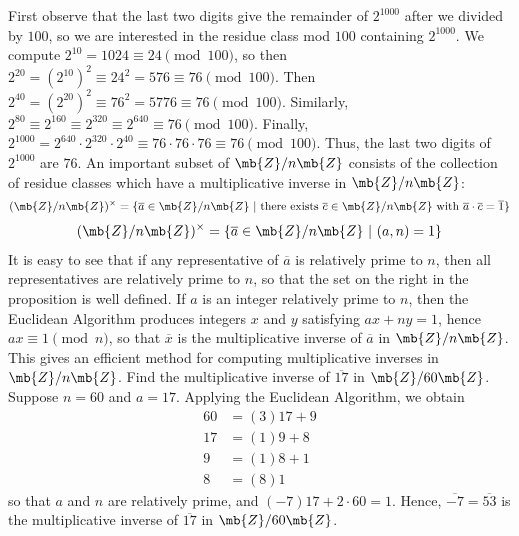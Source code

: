 {First observe that the last two digits give the remainder of $2^{1000}$ after we divided by $100$,
so we are interested in the residue class mod $100$ containing $2^{1000}$.
We compute $2^{10} = 1024 \equiv 24\pmod{100}$, so then $2^{20} = (2^{10})^{2}\equiv 24^{2} = 576\equiv 76\pmod{100}$.
Then $2^{40} = (2^{20})^{2}\equiv 76^{2} = 5776\equiv 76\pmod{100}$.
Similarly, $2^{80} \equiv 2^{160} \equiv 2^{320} \equiv 2^{640} \equiv 76\pmod{100}$.
Finally, $2^{1000} = 2^{640}\cdot 2^{320}\cdot 2^{40} \equiv 76\cdot 76\cdot 76 \equiv 76 \pmod{100}$.
Thus, the last two digits of $2^{1000}$ are $76$.
}
\newpage
\thispagestyle{oddpagestyle}
An important subset of $\mb{Z}/n\mb{Z}$ consists of the collection of residue classes which have a multiplicative inverse in $\mb{Z}/n\mb{Z}$:
\begin{align*}
    (\mb{Z}/n\mb{Z})^{\times} = \{\overline{a}\in\mb{Z}/n\mb{Z}\ |\ \text{there exists } \overline{c}\in\mb{Z}/n\mb{Z} \text{ with } \overline{a}\cdot\overline{c} = \overline{1}\}
\end{align*}
{\begin{align*}
    (\mb{Z}/n\mb{Z})^{\times} = \{\overline{a}\in\mb{Z}/n\mb{Z}\ |\ (a,n) = 1\}
\end{align*}}
{It is easy to see that if any representative of $\overline{a}$ is relatively prime to $n$,
then all representatives are relatively prime to $n$, so that the set on the right in the proposition is well defined.
}
If $a$ is an integer relatively prime to $n$, then the Euclidean Algorithm produces integers $x$ and $y$ satisfying
$ax+ny=1$, hence $ax\equiv 1\pmod{n}$, so that $\overline{x}$ is the multiplicative inverse of $\overline{a}$ in $\mb{Z}/n\mb{Z}$.
This gives an efficient method for computing multiplicative inverses in $\mb{Z}/n\mb{Z}$.
{Find the multiplicative inverse of $\overline{17}$ in $\mb{Z}/60\mb{Z}$.
}
{Suppose $n=60$ and $a=17$. Applying the Euclidean Algorithm, we obtain
\begin{align*}
    60 &= (3) 17 + 9\\
    17 &= (1) 9 + 8\\
    9 &= (1) 8 + 1\\
    8 &= (8) 1
\end{align*}
so that $a$ and $n$ are relatively prime, and $(-7)17 + 2\cdot 60 = 1$.
Hence, $\overline{-7}=\overline{53}$ is the multiplicative inverse of $\overline{17}$ in $\mb{Z}/60\mb{Z}$.
}